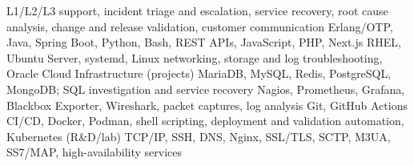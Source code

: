{L1/L2/L3 support, incident triage and escalation, service recovery, root cause analysis,
change and release validation, customer communication}
{Erlang/OTP, Java, Spring Boot, Python, Bash, REST APIs, JavaScript, PHP, Next.js}
{RHEL, Ubuntu Server, systemd, Linux networking, storage and log troubleshooting,
Oracle Cloud Infrastructure (projects)}
{MariaDB, MySQL, Redis, PostgreSQL, MongoDB; SQL investigation and service recovery}
{Nagios, Prometheus, Grafana, Blackbox Exporter, Wireshark, packet captures, log analysis}
{Git, GitHub Actions CI/CD, Docker, Podman, shell scripting, deployment and validation automation,
Kubernetes (R\&D/lab)}
{TCP/IP, SSH, DNS, Nginx, SSL/TLS, SCTP, M3UA, SS7/MAP, high-availability services}
